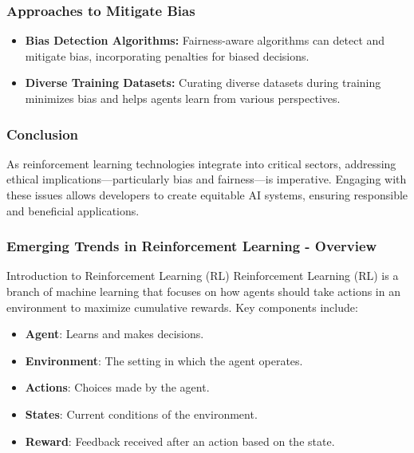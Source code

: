 \documentclass{beamer}
\begin{document}
\begin{frame}[fragile]
    \frametitle{Approaches to Mitigate Bias}
    \begin{itemize}
        \item \textbf{Bias Detection Algorithms:} Fairness-aware algorithms can detect and mitigate bias, incorporating penalties for biased decisions.
        
        \item \textbf{Diverse Training Datasets:} Curating diverse datasets during training minimizes bias and helps agents learn from various perspectives.
    \end{itemize}
\end{frame}

\begin{frame}[fragile]
    \frametitle{Conclusion}
    As reinforcement learning technologies integrate into critical sectors, addressing ethical implications—particularly bias and fairness—is imperative. Engaging with these issues allows developers to create equitable AI systems, ensuring responsible and beneficial applications.
\end{frame}

\begin{frame}[fragile]
    \frametitle{Emerging Trends in Reinforcement Learning - Overview}
    \begin{block}{Introduction to Reinforcement Learning (RL)}
    Reinforcement Learning (RL) is a branch of machine learning that focuses on how agents should take actions in an environment to maximize cumulative rewards. Key components include:
    \begin{itemize}
        \item \textbf{Agent}: Learns and makes decisions.
        \item \textbf{Environment}: The setting in which the agent operates.
        \item \textbf{Actions}: Choices made by the agent.
        \item \textbf{States}: Current conditions of the environment.
        \item \textbf{Reward}: Feedback received after an action based on the state.
    \end{itemize}
    \end{block}
\end{frame}
\end{document}
